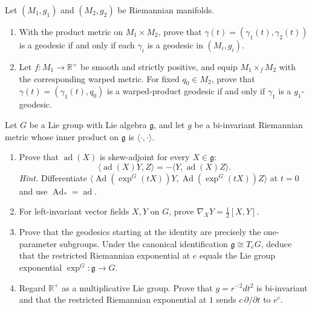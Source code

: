 \begin{exercise}
\label{prob:geodesics-product-warped-metrics}
\label{prob:geodesic-warped-product}

Let $(M_1,g_1)$ and $(M_2,g_2)$ be Riemannian manifolds.
\begin{enumerate}
\item[(a)] With the product metric on $M_1\times M_2$, prove that
$\gamma(t)=(\gamma_1(t),\gamma_2(t))$ is a geodesic if and only if each
$\gamma_i$ is a geodesic in $(M_i,g_i)$.
\item[(b)] Let $f:M_1\to\mathbb R^+$ be smooth and strictly positive, and
equip $M_1\times_fM_2$ with the corresponding warped metric. For fixed
$q_0\in M_2$, prove that $\gamma(t)=(\gamma_1(t),q_0)$ is a warped-product
geodesic if and only if $\gamma_1$ is a $g_1$-geodesic.
\end{enumerate}
\end{exercise}

\begin{exercise}
\label{prob:lie-group-bi-invariant-metric}

Let $G$ be a Lie group with Lie algebra $\mathfrak g$, and let $g$ be a
bi-invariant Riemannian metric whose inner product on $\mathfrak g$ is
$\langle\cdot,\cdot\rangle$.
\begin{enumerate}
\item[(a)] Prove that $\operatorname{ad}(X)$ is skew-adjoint for every
$X\in\mathfrak g$:
\[
\langle\operatorname{ad}(X)Y,Z\rangle
=-\langle Y,\operatorname{ad}(X)Z\rangle.
\]
\emph{Hint.} Differentiate
$\langle\operatorname{Ad}(\exp^G(tX))Y,
\operatorname{Ad}(\exp^G(tX))Z\rangle$ at $t=0$ and use
$\operatorname{Ad}_*=\operatorname{ad}$.
\item[(b)] For left-invariant vector fields $X,Y$ on $G$, prove
$\nabla_XY=\frac12[X,Y]$.
\item[(c)] Prove that the geodesics starting at the identity are precisely the
one-parameter subgroups. Under the canonical identification
$\mathfrak g\cong T_eG$, deduce that the restricted Riemannian exponential at
$e$ equals the Lie group exponential $\exp^G:\mathfrak g\to G$.
\item[(d)] Regard $\mathbb R^+$ as a multiplicative Lie group. Prove that
$g=r^{-2}dt^2$ is bi-invariant and that the restricted Riemannian exponential
at $1$ sends $c\,\partial/\partial t$ to $e^c$.
\end{enumerate}
\end{exercise}

